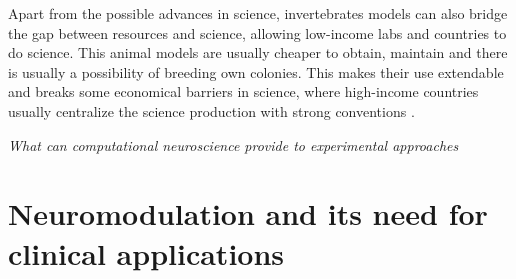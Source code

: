 Apart from the possible advances in science, invertebrates models can also bridge the gap between resources and science, allowing low-income labs and countries to do science. This animal models are usually cheaper to obtain, maintain and there is usually a possibility of breeding own colonies. This makes their use extendable and breaks some economical barriers in science, where high-income countries usually centralize the science production with strong conventions \cite{castillo_spineless_2017,stephan_how_2015}. 

\textit{What can computational neuroscience provide to experimental approaches}
\section{Neuromodulation and its need for clinical applications}